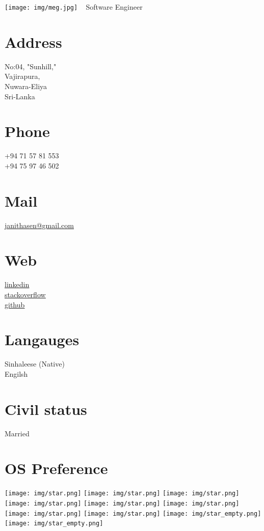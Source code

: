 \documentclass[]{cv-class}
\begin{document}
\begin{aside}
\color{blue}
  \texttt{[image: img/meg.jpg]}
    ~
      {Software Engineer}
   ~
  \section{Address}
    {\whitebodyfont No:04, "Sunhill,"\\
    Vajirapura,\\
    Nuwara-Eliya\\
    Sri-Lanka}
    ~
  \section{Phone}
    {\whitebodyfont +94 71 57 81 553\\
    +94 75 97 46 502}
    ~
  \section{Mail}
    \underline{\href{mailto:janithasen@gmail.com}{{\whitebodyfont janithasen@gmail.com}}}
    ~
  \section{Web}
  	\vspace{0.10cm}
    \underline{\href{https://www.linkedin.com/in/janithamadushan}{{\whitebodyfont linkedin}}}
    \\
	\vspace{0.10cm}
    \underline{\href{https://stackoverflow.com/story/jmadushan}{{\whitebodyfont stackoverflow}}}
	\\	
	\vspace{0.10cm}
    \underline{\href{https://github.com/janitham}{{\whitebodyfont github}}}
    ~
  \section{Langauges}
  	{\whitebodyfont Sinhaleese (Native)\\
    Engilsh}
    ~
  \section{Civil status}
    {\whitebodyfont Married}
  	~  
  \section{OS Preference}
    {\texttt{[image: img/star.png]}
    \texttt{[image: img/star.png]}
    \texttt{[image: img/star.png]}
    \texttt{[image: img/star.png]}
    \texttt{[image: img/star.png]}}
    {\texttt{[image: img/star.png]}
    \texttt{[image: img/star.png]}
    \texttt{[image: img/star.png]}
    \texttt{[image: img/star\_empty.png]}
    \texttt{[image: img/star\_empty.png]}}
    ~

\end{aside}
\end{document}
